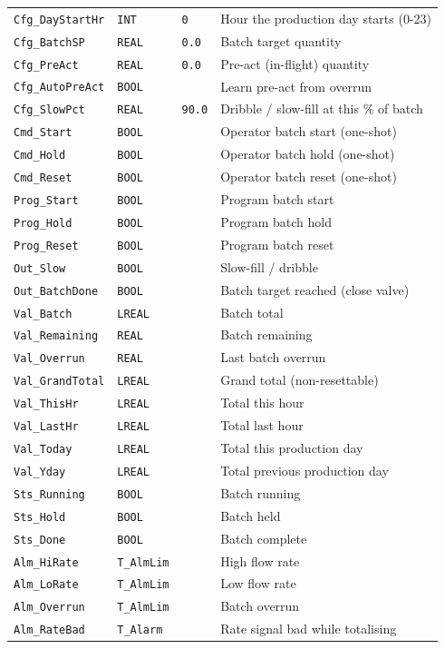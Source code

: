 {\begin{longtable}{@{}>{\raggedright\arraybackslash}p{3.4cm}>{\raggedright\arraybackslash}p{3.3cm}>{\raggedright\arraybackslash}p{1.3cm}>{\raggedright\arraybackslash}p{6.4cm}@{}}
\texttt{Cfg\_DayStartHr} & \texttt{INT} & \texttt{0} & Hour the production day starts (0-23) \\
\texttt{Cfg\_BatchSP} & \texttt{REAL} & \texttt{0.0} & Batch target quantity \\
\texttt{Cfg\_PreAct} & \texttt{REAL} & \texttt{0.0} & Pre-act (in-flight) quantity \\
\texttt{Cfg\_AutoPreAct} & \texttt{BOOL} &  & Learn pre-act from overrun \\
\texttt{Cfg\_SlowPct} & \texttt{REAL} & \texttt{90.0} & Dribble /\allowbreak{} slow-fill at this \% of batch \\
\texttt{Cmd\_Start} & \texttt{BOOL} &  & Operator batch start (one-shot) \\
\texttt{Cmd\_Hold} & \texttt{BOOL} &  & Operator batch hold (one-shot) \\
\texttt{Cmd\_Reset} & \texttt{BOOL} &  & Operator batch reset (one-shot) \\
\texttt{Prog\_Start} & \texttt{BOOL} &  & Program batch start \\
\texttt{Prog\_Hold} & \texttt{BOOL} &  & Program batch hold \\
\texttt{Prog\_Reset} & \texttt{BOOL} &  & Program batch reset \\
\texttt{Out\_Slow} & \texttt{BOOL} &  & Slow-fill /\allowbreak{} dribble \\
\texttt{Out\_BatchDone} & \texttt{BOOL} &  & Batch target reached (close valve) \\
\texttt{Val\_Batch} & \texttt{LREAL} &  & Batch total \\
\texttt{Val\_Remaining} & \texttt{REAL} &  & Batch remaining \\
\texttt{Val\_Overrun} & \texttt{REAL} &  & Last batch overrun \\
\texttt{Val\_GrandTotal} & \texttt{LREAL} &  & Grand total (non-resettable) \\
\texttt{Val\_ThisHr} & \texttt{LREAL} &  & Total this hour \\
\texttt{Val\_LastHr} & \texttt{LREAL} &  & Total last hour \\
\texttt{Val\_Today} & \texttt{LREAL} &  & Total this production day \\
\texttt{Val\_Yday} & \texttt{LREAL} &  & Total previous production day \\
\texttt{Sts\_Running} & \texttt{BOOL} &  & Batch running \\
\texttt{Sts\_Hold} & \texttt{BOOL} &  & Batch held \\
\texttt{Sts\_Done} & \texttt{BOOL} &  & Batch complete \\
\texttt{Alm\_HiRate} & \texttt{T\_AlmLim} &  & High flow rate \\
\texttt{Alm\_LoRate} & \texttt{T\_AlmLim} &  & Low flow rate \\
\texttt{Alm\_Overrun} & \texttt{T\_AlmLim} &  & Batch overrun \\
\texttt{Alm\_RateBad} & \texttt{T\_Alarm} &  & Rate signal bad while totalising \\
\bottomrule
\end{longtable}
}
